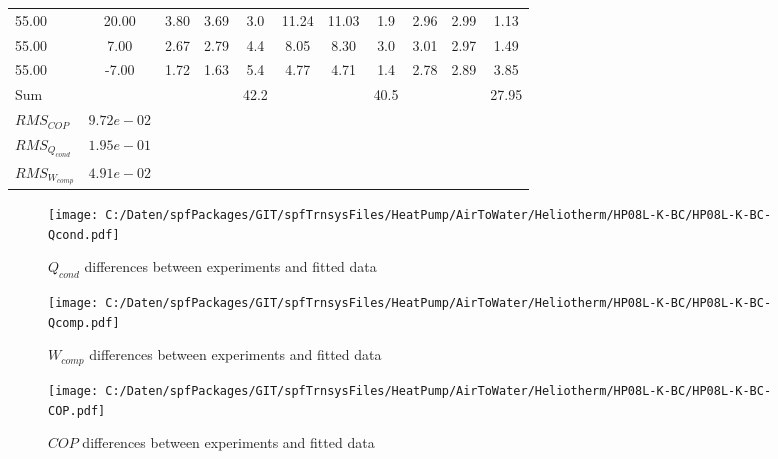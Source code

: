 \documentclass[english]{SPFShortReport}
\begin{document}
\begin{table}[!ht]
\begin{small}
\begin{center}
{\begin{tabular}{l | c c c c c c c c c c }
55.00  & 20.00 & 3.80 & 3.69 & 3.0 & 11.24 & 11.03 & 1.9 & 2.96 & 2.99 & 1.13\\ 
55.00  & 7.00 & 2.67 & 2.79 & 4.4 & 8.05 & 8.30 & 3.0 & 3.01 & 2.97 & 1.49\\ 
55.00  & -7.00 & 1.72 & 1.63 & 5.4 & 4.77 & 4.71 & 1.4 & 2.78 & 2.89 & 3.85\\ 
\hline 
 Sum &  & &  & 42.2 &  &  & 40.5 & &  & 27.95\\ 
\hline 
 $RMS_{COP}$ & $9.72e-02$ \\ 
 $RMS_{Q_{cond}}$ & $1.95e-01$ \\ 
 $RMS_{W_{comp}}$ & $4.91e-02$ \\ 
\hline
\hline
\end{tabular}
}
\label{ErrorsTable}
\end{center}
\end{small}
\end{table}
\begin{figure}[!ht]
\begin{center}
\texttt{[image: C:/Daten/spfPackages/GIT/spfTrnsysFiles/HeatPump/AirToWater/Heliotherm/HP08L-K-BC/HP08L-K-BC-Qcond.pdf]}
\caption{$Q_{cond}$ differences between experiments and fitted data}
\label{QcongFig}
\end{center}
\end{figure}
\begin{figure}[!ht]
\begin{center}
\texttt{[image: C:/Daten/spfPackages/GIT/spfTrnsysFiles/HeatPump/AirToWater/Heliotherm/HP08L-K-BC/HP08L-K-BC-Qcomp.pdf]}
\caption{$W_{comp}$ differences between experiments and fitted data}
\label{QcompFig}
\end{center}
\end{figure}
\begin{figure}[!ht]
\begin{center}
\texttt{[image: C:/Daten/spfPackages/GIT/spfTrnsysFiles/HeatPump/AirToWater/Heliotherm/HP08L-K-BC/HP08L-K-BC-COP.pdf]}
\caption{$COP$ differences between experiments and fitted data}
\label{COPFig}
\end{center}
\end{figure}
\end{document}

